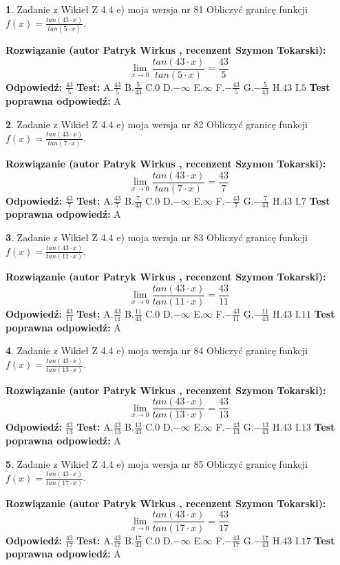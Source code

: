 \documentclass[12pt, a4paper]{article}
\theoremstyle{definition} %
\newtheorem{zad}{}
\newcommand{\zadStart}[1]{\begin{zad}#1\newline}
\newcommand{\zadStop}{\end{zad}}
\newcommand{\rozwStart}[2]{\noindent \textbf{Rozwiązanie (autor #1 , recenzent #2): }\newline}
\newcommand{\rozwStop}{\newline}
\newcommand{\odpStart}{\noindent \textbf{Odpowiedź:}\newline}
\newcommand{\odpStop}{\newline}
\newcommand{\testStart}{\noindent \textbf{Test:}\newline}
\newcommand{\testStop}{\newline}
\newcommand{\kluczStart}{\noindent \textbf{Test poprawna odpowiedź:}\newline}
\newcommand{\kluczStop}{\newline}
\begin{document}
\zadStart{Zadanie z Wikieł Z 4.4 e) moja wersja nr 81}
Obliczyć granicę funkcji $f(x)=\frac{tan(43\cdot x)}{tan(5\cdot x)}$.
\zadStop
\rozwStart{Patryk Wirkus}{Szymon Tokarski}
$$\lim\limits_{x\to 0}\frac{tan(43\cdot x)}{tan(5\cdot x)}=
\frac{43}{5}$$
\rozwStop
\odpStart
$\frac{43}{5}$
\odpStop
\testStart
A.$\frac{43}{5}$
B.$\frac{5}{43}$
C.$0$
D.$-\infty$
E.$\infty$
F.$-\frac{43}{5}$
G.$-\frac{5}{43}$
H.$43$
I.$5$
\testStop
\kluczStart
A
\kluczStop



\zadStart{Zadanie z Wikieł Z 4.4 e) moja wersja nr 82}
Obliczyć granicę funkcji $f(x)=\frac{tan(43\cdot x)}{tan(7\cdot x)}$.
\zadStop
\rozwStart{Patryk Wirkus}{Szymon Tokarski}
$$\lim\limits_{x\to 0}\frac{tan(43\cdot x)}{tan(7\cdot x)}=
\frac{43}{7}$$
\rozwStop
\odpStart
$\frac{43}{7}$
\odpStop
\testStart
A.$\frac{43}{7}$
B.$\frac{7}{43}$
C.$0$
D.$-\infty$
E.$\infty$
F.$-\frac{43}{7}$
G.$-\frac{7}{43}$
H.$43$
I.$7$
\testStop
\kluczStart
A
\kluczStop



\zadStart{Zadanie z Wikieł Z 4.4 e) moja wersja nr 83}
Obliczyć granicę funkcji $f(x)=\frac{tan(43\cdot x)}{tan(11\cdot x)}$.
\zadStop
\rozwStart{Patryk Wirkus}{Szymon Tokarski}
$$\lim\limits_{x\to 0}\frac{tan(43\cdot x)}{tan(11\cdot x)}=
\frac{43}{11}$$
\rozwStop
\odpStart
$\frac{43}{11}$
\odpStop
\testStart
A.$\frac{43}{11}$
B.$\frac{11}{43}$
C.$0$
D.$-\infty$
E.$\infty$
F.$-\frac{43}{11}$
G.$-\frac{11}{43}$
H.$43$
I.$11$
\testStop
\kluczStart
A
\kluczStop



\zadStart{Zadanie z Wikieł Z 4.4 e) moja wersja nr 84}
Obliczyć granicę funkcji $f(x)=\frac{tan(43\cdot x)}{tan(13\cdot x)}$.
\zadStop
\rozwStart{Patryk Wirkus}{Szymon Tokarski}
$$\lim\limits_{x\to 0}\frac{tan(43\cdot x)}{tan(13\cdot x)}=
\frac{43}{13}$$
\rozwStop
\odpStart
$\frac{43}{13}$
\odpStop
\testStart
A.$\frac{43}{13}$
B.$\frac{13}{43}$
C.$0$
D.$-\infty$
E.$\infty$
F.$-\frac{43}{13}$
G.$-\frac{13}{43}$
H.$43$
I.$13$
\testStop
\kluczStart
A
\kluczStop



\zadStart{Zadanie z Wikieł Z 4.4 e) moja wersja nr 85}
Obliczyć granicę funkcji $f(x)=\frac{tan(43\cdot x)}{tan(17\cdot x)}$.
\zadStop
\rozwStart{Patryk Wirkus}{Szymon Tokarski}
$$\lim\limits_{x\to 0}\frac{tan(43\cdot x)}{tan(17\cdot x)}=
\frac{43}{17}$$
\rozwStop
\odpStart
$\frac{43}{17}$
\odpStop
\testStart
A.$\frac{43}{17}$
B.$\frac{17}{43}$
C.$0$
D.$-\infty$
E.$\infty$
F.$-\frac{43}{17}$
G.$-\frac{17}{43}$
H.$43$
I.$17$
\testStop
\kluczStart
A
\kluczStop
\end{document}
